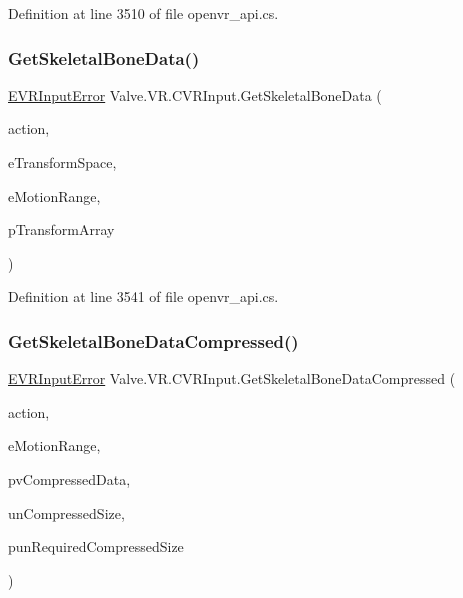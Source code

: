 Definition at line 3510 of file openvr\+\_\+api.\+cs.

\mbox{\label{class_valve_1_1_v_r_1_1_c_v_r_input_a9f1c4b139b9b4936734dde7806b112d4}} 
\subsubsection{\texorpdfstring{GetSkeletalBoneData()}{GetSkeletalBoneData()}}
{\footnotesize\ttfamily \mbox{\hyperlink{namespace_valve_1_1_v_r_a592d7f4189b8346d6c96dbdbaa35bc1b}{E\+V\+R\+Input\+Error}} Valve.\+V\+R.\+C\+V\+R\+Input.\+Get\+Skeletal\+Bone\+Data (\begin{DoxyParamCaption}\item[{ulong}]{action,  }\item[{\mbox{\hyperlink{namespace_valve_1_1_v_r_a916744fb3fc7b8e8ba224fba9bee6de4}{E\+V\+R\+Skeletal\+Transform\+Space}}}]{e\+Transform\+Space,  }\item[{\mbox{\hyperlink{namespace_valve_1_1_v_r_affc8d18345f8f5d36f1ae7b4ce534500}{E\+V\+R\+Skeletal\+Motion\+Range}}}]{e\+Motion\+Range,  }\item[{\mbox{\hyperlink{struct_valve_1_1_v_r_1_1_v_r_bone_transform__t}{V\+R\+Bone\+Transform\+\_\+t}} \mbox{[}$\,$\mbox{]}}]{p\+Transform\+Array }\end{DoxyParamCaption})}



Definition at line 3541 of file openvr\+\_\+api.\+cs.

\mbox{\label{class_valve_1_1_v_r_1_1_c_v_r_input_a1cf34cb3404a64c3ee90959add5add32}} 
\subsubsection{\texorpdfstring{GetSkeletalBoneDataCompressed()}{GetSkeletalBoneDataCompressed()}}
{\footnotesize\ttfamily \mbox{\hyperlink{namespace_valve_1_1_v_r_a592d7f4189b8346d6c96dbdbaa35bc1b}{E\+V\+R\+Input\+Error}} Valve.\+V\+R.\+C\+V\+R\+Input.\+Get\+Skeletal\+Bone\+Data\+Compressed (\begin{DoxyParamCaption}\item[{ulong}]{action,  }\item[{\mbox{\hyperlink{namespace_valve_1_1_v_r_affc8d18345f8f5d36f1ae7b4ce534500}{E\+V\+R\+Skeletal\+Motion\+Range}}}]{e\+Motion\+Range,  }\item[{Int\+Ptr}]{pv\+Compressed\+Data,  }\item[{uint}]{un\+Compressed\+Size,  }\item[{ref uint}]{pun\+Required\+Compressed\+Size }\end{DoxyParamCaption})}



